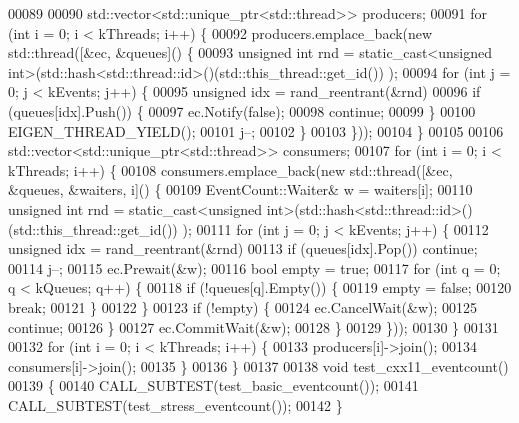 \begin{DoxyCode}
00089 
00090   std::vector<std::unique\_ptr<std::thread>> producers;
00091   \textcolor{keywordflow}{for} (\textcolor{keywordtype}{int} i = 0; i < kThreads; i++) \{
00092     producers.emplace\_back(\textcolor{keyword}{new} std::thread([&ec, &queues]() \{
00093       \textcolor{keywordtype}{unsigned} \textcolor{keywordtype}{int} rnd = \textcolor{keyword}{static\_cast<}\textcolor{keywordtype}{unsigned} \textcolor{keywordtype}{int}\textcolor{keyword}{>}(std::hash<std::thread::id>()(std::this\_thread::get\_id())
      );
00094       \textcolor{keywordflow}{for} (\textcolor{keywordtype}{int} j = 0; j < kEvents; j++) \{
00095         \textcolor{keywordtype}{unsigned} idx = rand\_reentrant(&rnd) %
00096         \textcolor{keywordflow}{if} (queues[idx].Push()) \{
00097           ec.Notify(\textcolor{keyword}{false});
00098           \textcolor{keywordflow}{continue};
00099         \}
00100         EIGEN\_THREAD\_YIELD();
00101         j--;
00102       \}
00103     \}));
00104   \}
00105 
00106   std::vector<std::unique\_ptr<std::thread>> consumers;
00107   \textcolor{keywordflow}{for} (\textcolor{keywordtype}{int} i = 0; i < kThreads; i++) \{
00108     consumers.emplace\_back(\textcolor{keyword}{new} std::thread([&ec, &queues, &waiters, i]() \{
00109       EventCount::Waiter& w = waiters[i];
00110       \textcolor{keywordtype}{unsigned} \textcolor{keywordtype}{int} rnd = \textcolor{keyword}{static\_cast<}\textcolor{keywordtype}{unsigned} \textcolor{keywordtype}{int}\textcolor{keyword}{>}(std::hash<std::thread::id>()(std::this\_thread::get\_id())
      );
00111       \textcolor{keywordflow}{for} (\textcolor{keywordtype}{int} j = 0; j < kEvents; j++) \{
00112         \textcolor{keywordtype}{unsigned} idx = rand\_reentrant(&rnd) %
00113         \textcolor{keywordflow}{if} (queues[idx].Pop()) \textcolor{keywordflow}{continue};
00114         j--;
00115         ec.Prewait(&w);
00116         \textcolor{keywordtype}{bool} empty = \textcolor{keyword}{true};
00117         \textcolor{keywordflow}{for} (\textcolor{keywordtype}{int} q = 0; q < kQueues; q++) \{
00118           \textcolor{keywordflow}{if} (!queues[q].Empty()) \{
00119             empty = \textcolor{keyword}{false};
00120             \textcolor{keywordflow}{break};
00121           \}
00122         \}
00123         \textcolor{keywordflow}{if} (!empty) \{
00124           ec.CancelWait(&w);
00125           \textcolor{keywordflow}{continue};
00126         \}
00127         ec.CommitWait(&w);
00128       \}
00129     \}));
00130   \}
00131 
00132   \textcolor{keywordflow}{for} (\textcolor{keywordtype}{int} i = 0; i < kThreads; i++) \{
00133     producers[i]->join();
00134     consumers[i]->join();
00135   \}
00136 \}
00137 
00138 \textcolor{keywordtype}{void} test\_cxx11\_eventcount()
00139 \{
00140   CALL\_SUBTEST(test\_basic\_eventcount());
00141   CALL\_SUBTEST(test\_stress\_eventcount());
00142 \}
\end{DoxyCode}
